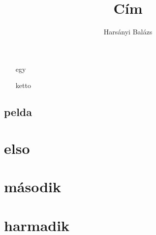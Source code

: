 \documentclass{book}
\title{Cím}
\author{Harsányi Balázs}
\begin{document}
\frontmatter
\maketitle
\tableofcontents

\begin{itemize}
\item[egy]
\item[ketto]
\end{itemize}


\mainmatter
\section*{pelda}
\chapter{elso}
\cite{abrharber03}
\chapter{második}
\chapter{harmadik}
\cite{knuth84}

\backmatter



\printindex
\end{document}
